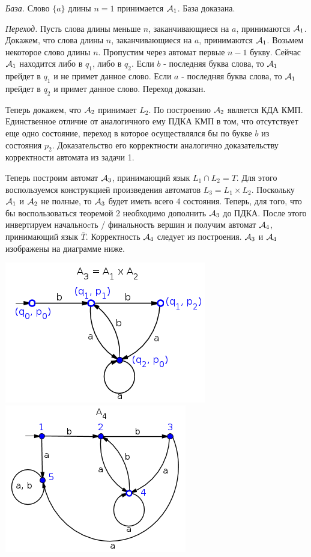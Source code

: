 \documentclass[10pt]{article}
\begin{document}
{\it База.} Слово $\{ a \}$ длины $n = 1$ принимается ${\cal A}_1$. База доказана.

{\it Переход.} Пусть слова длины меньше $n$, заканчивающиеся на $a$, принимаются ${\cal A}_1$. Докажем, что слова длины $n$, заканчивающиеся на $a$, принимаются ${\cal A}_1$. Возьмем некоторое слово длины $n$. Пропустим через автомат первые $n - 1$ букву. Сейчас ${\cal A}_1$ находится либо в $q_1$, либо в $q_2$. Если $b$ - последняя буква слова, то ${\cal A}_1$ прейдет в $q_1$ и не примет данное слово. Если $a$ - последняя буква слова, то ${\cal A}_1$ прейдет в $q_2$ и примет данное слово. Переход доказан.

Теперь докажем, что ${\cal A}_2$ принимает $L_2$. По построению ${\cal A}_2$ является КДА КМП. Единственное отличие от аналогичного ему ПДКА КМП в том, что отсутствует еще одно состояние, переход в которое осуществлялся бы по букве $b$ из состояния $p_2$. Доказательство его корректности аналогично доказательству корректности автомата из задачи 1.

Теперь построим автомат ${\cal A}_3$, принимающий язык $L_1 \cap L_2 = T$. Для этого воспользуемся конструкцией произведения автоматов $L_3 = L_1 \times L_2$. Поскольку ${\cal A}_1$ и ${\cal A}_2$ не полные, то ${\cal A}_3$ будет иметь всего 4 состояния. Теперь, для того, что бы воспользоваться теоремой 2 необходимо дополнить ${\cal A}_3$ до ПДКА. После этого инвертируем начальноcть / финальность вершин и получим автомат ${\cal A}_4$, принимающий язык $\bar T$. Корректность ${\cal A}_4$ следует из построения. ${\cal A}_3$ и ${\cal A}_4$ изображены на диаграмме ниже.

\centerline{\includegraphics{image-2-a3.png} \includegraphics{image-2-a4.png}}
\end{document}
